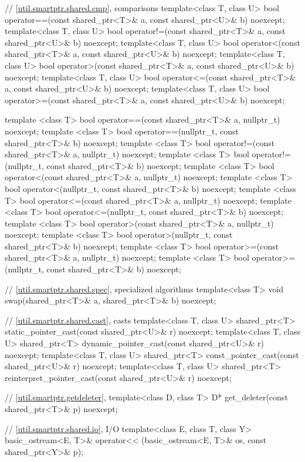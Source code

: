\begin{codeblock}
{  // \ref{util.smartptr.shared.cmp},  comparisons
  template<class T, class U>
    bool operator==(const shared_ptr<T>& a, const shared_ptr<U>& b) noexcept;
  template<class T, class U>
    bool operator!=(const shared_ptr<T>& a, const shared_ptr<U>& b) noexcept;
  template<class T, class U>
    bool operator<(const shared_ptr<T>& a, const shared_ptr<U>& b) noexcept;
  template<class T, class U>
    bool operator>(const shared_ptr<T>& a, const shared_ptr<U>& b) noexcept;
  template<class T, class U>
    bool operator<=(const shared_ptr<T>& a, const shared_ptr<U>& b) noexcept;
  template<class T, class U>
    bool operator>=(const shared_ptr<T>& a, const shared_ptr<U>& b) noexcept;

  template <class T>
    bool operator==(const shared_ptr<T>& a, nullptr_t) noexcept;
  template <class T>
    bool operator==(nullptr_t, const shared_ptr<T>& b) noexcept;
  template <class T>
    bool operator!=(const shared_ptr<T>& a, nullptr_t) noexcept;
  template <class T>
    bool operator!=(nullptr_t, const shared_ptr<T>& b) noexcept;
  template <class T>
    bool operator<(const shared_ptr<T>& a, nullptr_t) noexcept;
  template <class T>
    bool operator<(nullptr_t, const shared_ptr<T>& b) noexcept;
  template <class T>
    bool operator<=(const shared_ptr<T>& a, nullptr_t) noexcept;
  template <class T>
    bool operator<=(nullptr_t, const shared_ptr<T>& b) noexcept;
  template <class T>
    bool operator>(const shared_ptr<T>& a, nullptr_t) noexcept;
  template <class T>
    bool operator>(nullptr_t, const shared_ptr<T>& b) noexcept;
  template <class T>
    bool operator>=(const shared_ptr<T>& a, nullptr_t) noexcept;
  template <class T>
    bool operator>=(nullptr_t, const shared_ptr<T>& b) noexcept;

  // \ref{util.smartptr.shared.spec},  specialized algorithms
  template<class T>
    void swap(shared_ptr<T>& a, shared_ptr<T>& b) noexcept;

  // \ref{util.smartptr.shared.cast},  casts
  template<class T, class U>
    shared_ptr<T> static_pointer_cast(const shared_ptr<U>& r) noexcept;
  template<class T, class U>
    shared_ptr<T> dynamic_pointer_cast(const shared_ptr<U>& r) noexcept;
  template<class T, class U>
    shared_ptr<T> const_pointer_cast(const shared_ptr<U>& r) noexcept;
  template<class T, class U>
    shared_ptr<T> reinterpret_pointer_cast(const shared_ptr<U>& r) noexcept;

  // \ref{util.smartptr.getdeleter},  
  template<class D, class T>
    D* get_deleter(const shared_ptr<T>& p) noexcept;

  // \ref{util.smartptr.shared.io},  I/O
  template<class E, class T, class Y>
    basic_ostream<E, T>& operator<< (basic_ostream<E, T>& os, const shared_ptr<Y>& p);
}
\end{codeblock}

